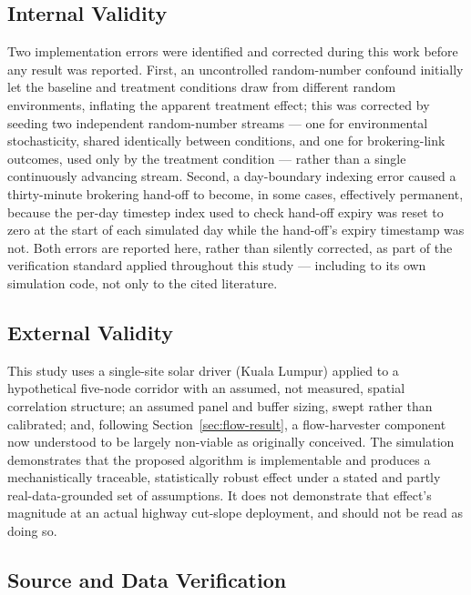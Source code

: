 \documentclass[electronics,article,submit,moreauthors]{Definitions/mdpi}
\begin{document}
\subsection{Internal Validity}
\label{sec:internal-validity}

Two implementation errors were identified and corrected during this work before any result was reported. First, an uncontrolled random-number confound initially let the baseline and treatment conditions draw from different random environments, inflating the apparent treatment effect; this was corrected by seeding two independent random-number streams --- one for environmental stochasticity, shared identically between conditions, and one for brokering-link outcomes, used only by the treatment condition --- rather than a single continuously advancing stream. Second, a day-boundary indexing error caused a thirty-minute brokering hand-off to become, in some cases, effectively permanent, because the per-day timestep index used to check hand-off expiry was reset to zero at the start of each simulated day while the hand-off's expiry timestamp was not. Both errors are reported here, rather than silently corrected, as part of the verification standard applied throughout this study --- including to its own simulation code, not only to the cited literature.

\subsection{External Validity}

This study uses a single-site solar driver (Kuala Lumpur) applied to a hypothetical five-node corridor with an assumed, not measured, spatial correlation structure; an assumed panel and buffer sizing, swept rather than calibrated; and, following Section~\ref{sec:flow-result}, a flow-harvester component now understood to be largely non-viable as originally conceived. The simulation demonstrates that the proposed algorithm is implementable and produces a mechanistically traceable, statistically robust effect under a stated and partly real-data-grounded set of assumptions. It does not demonstrate that effect's magnitude at an actual highway cut-slope deployment, and should not be read as doing so.

\subsection{Source and Data Verification}
\label{sec:verification}
\end{document}
